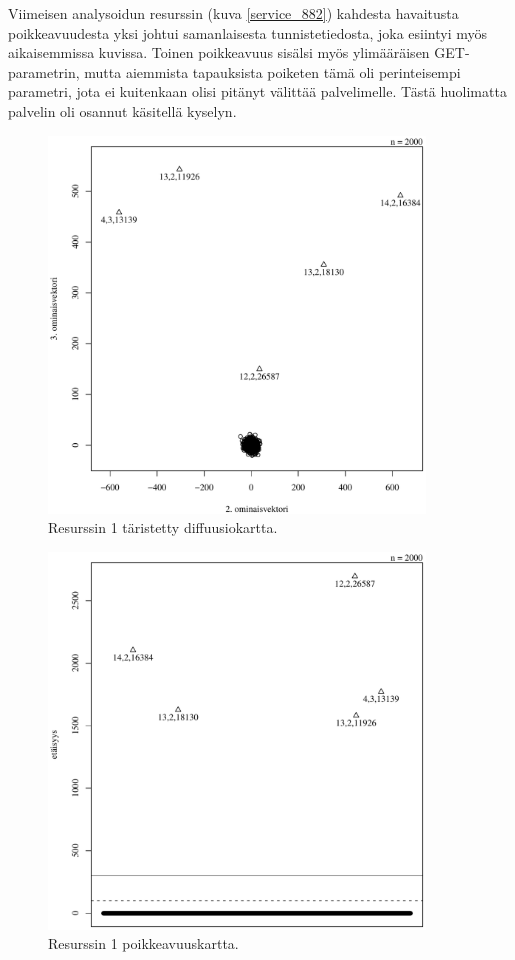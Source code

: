 Viimeisen analysoidun resurssin (kuva \ref{service_882}) kahdesta
havaitusta poikkeavuudesta yksi johtui samanlaisesta tunnistetiedosta,
joka esiintyi myös aikaisemmissa kuvissa. Toinen poikkeavuus sisälsi 
myös ylimääräisen GET-parametrin, mutta aiemmista tapauksista poiketen 
tämä oli perinteisempi parametri, jota ei kuitenkaan olisi pitänyt
välittää palvelimelle. Tästä huolimatta palvelin oli osannut käsitellä
kyselyn. 


\begin{figure}[p]
\centering
\includegraphics[width=10cm]{pics/diffuusiokuvat/service_1.pdf}
\caption{Resurssin 1 täristetty diffuusiokartta.}
\label{diffuusio_1}
\end{figure}

\begin{figure}[p]
\centering
\includegraphics[width=10cm]{pics/tiheyskuvat/service_1.pdf}
\caption{Resurssin 1 poikkeavuuskartta.}
\label{service_1}
\end{figure}

